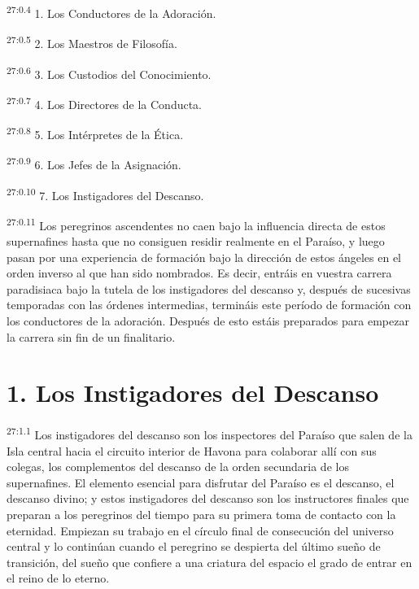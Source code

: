 \par
\textsuperscript{27:0.4} 1. Los Conductores de la Adoración.

\par
\textsuperscript{27:0.5} 2. Los Maestros de Filosofía.

\par
\textsuperscript{27:0.6} 3. Los Custodios del Conocimiento.

\par
\textsuperscript{27:0.7} 4. Los Directores de la Conducta.

\par
\textsuperscript{27:0.8} 5. Los Intérpretes de la Ética.

\par
\textsuperscript{27:0.9} 6. Los Jefes de la Asignación.

\par
\textsuperscript{27:0.10} 7. Los Instigadores del Descanso.

\par
\textsuperscript{27:0.11} Los peregrinos ascendentes no caen bajo la influencia directa de estos supernafines hasta que no consiguen residir realmente en el Paraíso, y luego pasan por una experiencia de formación bajo la dirección de estos ángeles en el orden inverso al que han sido nombrados. Es decir, entráis en vuestra carrera paradisiaca bajo la tutela de los instigadores del descanso y, después de sucesivas temporadas con las órdenes intermedias, termináis este período de formación con los conductores de la adoración. Después de esto estáis preparados para empezar la carrera sin fin de un finalitario.

\section*{1. Los Instigadores del Descanso}
\par
\textsuperscript{27:1.1} Los instigadores del descanso son los inspectores del Paraíso que salen de la Isla central hacia el circuito interior de Havona para colaborar allí con sus colegas, los complementos del descanso de la orden secundaria de los supernafines. El elemento esencial para disfrutar del Paraíso es el descanso, el descanso divino; y estos instigadores del descanso son los instructores finales que preparan a los peregrinos del tiempo para su primera toma de contacto con la eternidad. Empiezan su trabajo en el círculo final de consecución del universo central y lo continúan cuando el peregrino se despierta del último sueño de transición, del sueño que confiere a una criatura del espacio el grado de entrar en el reino de lo eterno.

